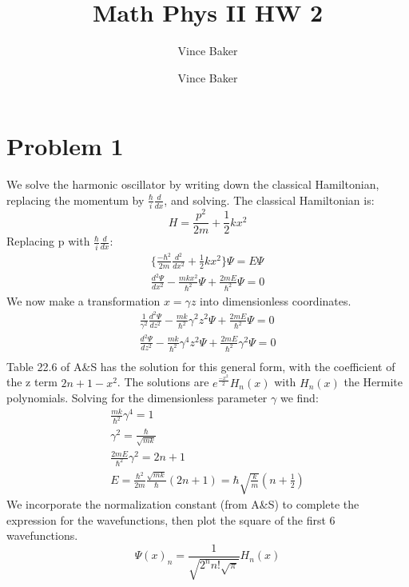 \documentclass[a4paper,10pt]{article}
\title{Math Phys II HW 2}
\author{Vince Baker}
\title{}
\author{Vince Baker}
\numberwithin{equation}{section}
\begin{document}
\maketitle

\begin{abstract}

\end{abstract}

\section{Problem 1}
We solve the harmonic oscillator by writing down the classical Hamiltonian, replacing the momentum by $\frac{\hbar}{i}\frac{d}{dx}$, and solving.
The classical Hamiltonian is:
\begin{equation}
H=\frac{p^2}{2m}+\frac{1}{2}kx^2
\end{equation}
Replacing p with $\frac{\hbar}{i}\frac{d}{dx}$:
\begin{gather}
\{ \frac{-\hbar ^2}{2m}\frac{d^2}{dx ^2}+\frac{1}{2}kx^2\}\Psi=E\Psi\\
\frac{d^2 \Psi}{dx^2}-\frac{mkx^2}{\hbar ^2}\Psi+\frac{2mE}{\hbar^2}\Psi=0
\end{gather}
We now make a transformation $x=\gamma z$ into dimensionless coordinates.
\begin{gather}
\frac{1}{\gamma ^2}\frac{d^2 \Psi}{dz^2}-\frac{mk}{\hbar ^2}\gamma^2z^2\Psi+\frac{2mE}{\hbar^2}\Psi=0\\ 
\frac{d^2 \Psi}{dz^2}-\frac{mk}{\hbar ^2}\gamma^4z^2\Psi+\frac{2mE}{\hbar^2}\gamma ^2\Psi=0\\ 
\end{gather}
Table 22.6 of A\&S has the solution for this general form, with the coefficient of the z term $2n+1-x^2$.
The solutions are $e^{\frac{-x^2}{2}}H_n(x)$ with $H_n(x)$ the Hermite polynomials. 
Solving for the dimensionless parameter $\gamma$ we find:
\begin{gather}
\frac{mk}{\hbar ^2} \gamma ^4=1\\
\gamma ^2=\frac{\hbar }{\sqrt{mk}}\\
\frac{2mE}{\hbar ^2}\gamma ^2=2n+1\\
E=\frac{\hbar ^2}{2m}\frac{\sqrt{mk}}{\hbar}(2n+1)=\hbar \sqrt{\frac{k}{m}}(n+\frac{1}{2})
\end{gather}
We incorporate the normalization constant (from A\&S) to complete the expression for the wavefunctions, then plot the square of the first 6 wavefunctions.
\begin{equation}
 \Psi(x)_n=\frac{1}{\sqrt{2^n n! \sqrt{\pi}}}H_n(x)
\end{equation}
\end{document}
